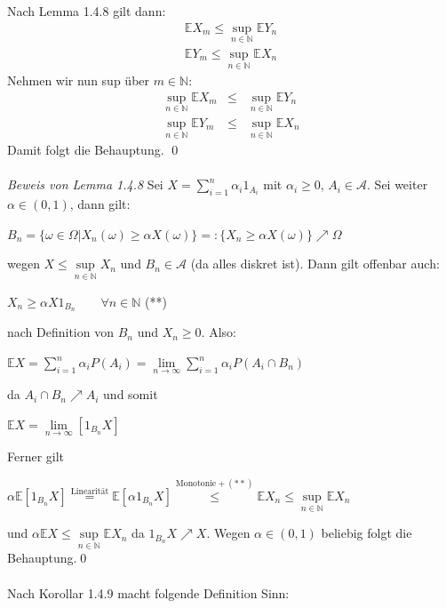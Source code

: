 \documentclass[10pt,a4paper]{report}
\numberwithin{equation}{section}
\numberwithin{figure}{section}
\theoremstyle{plain}
\theoremstyle{definition}
\theoremstyle{plain}
\theoremstyle{definition}
\theoremstyle{remark}
\theoremstyle{plain}
\begin{document}
Nach Lemma 1.4.8 gilt dann:
\begin{eqnarray*}
\mathbb{E}X_m\leq \sup\limits_{n\in \mathbb{N}}\mathbb{E} Y_n
\end{eqnarray*}
\begin{eqnarray*}
\mathbb{E}Y_m\leq \sup\limits_{n\in \mathbb{N}}\mathbb{E} X_n
\end{eqnarray*}
Nehmen wir nun sup über $m \in \mathbb{N}$:
\begin{eqnarray*}
\sup\limits_{n\in \mathbb{N}}\mathbb{E}X_m &\leq &\sup\limits_{n\in \mathbb{N}}\mathbb{E}Y_n\\
\sup\limits_{n\in \mathbb{N}}\mathbb{E}Y_m &\leq &\sup\limits_{n\in \mathbb{N}}\mathbb{E}X_n
\end{eqnarray*}
Damit folgt die Behauptung. \qed\\\\
\textit{Beweis von Lemma 1.4.8}
Sei $X=\sum\limits_{i=1}^n\alpha_i1_{A_i}$ mit $\alpha_i \geq 0$, $A_i \in \mathcal{A}$. Sei weiter $\alpha \in (0,1)$, dann gilt:
\begin{center}
$B_n=\{\omega \in \Omega|X_n(\omega)\geq \alpha X(\omega)\}=:\{X_n\geq \alpha X(\omega)\}\nearrow \Omega$
\end{center}
wegen  $X \leq \sup\limits_{n\in \mathbb{N}} X_n$ und $B_n \in \mathcal{A}$ (da alles diskret ist). Dann gilt offenbar auch:
\begin{center}
$X_n \geq \alpha X1_{B_n} \qquad \forall n \in \mathbb{N}$ (**)
\end{center}
nach Definition von $B_n$ und $X_n\geq 0$. Also:
\begin{center}
$\mathbb{E}X=\sum\limits_{i=1}^n\alpha_i P(A_i)=\lim\limits_{n \to \infty} \sum\limits_{i=1}^n\alpha_i P(A_i\cap B_n)$
\end{center}
da $A_i\cap B_n \nearrow A_i$ und somit
\begin{center}
$\mathbb{E}X=\lim\limits_{n \to \infty}[1_{B_n}X]$
\end{center}
Ferner gilt
\begin{center}
$\alpha \mathbb{E}[1_{B_n}X]\overset{\text{Linearität}}{=}\mathbb{E}[\alpha 1_{B_n}X]\overset{\text{Monotonie}+(**)}{\leq}\mathbb{E}X_n\leq\sup\limits_{n\in \mathbb{N}}\mathbb{E}X_n$
\end{center}
und $\alpha \mathbb{E}X\leq \sup\limits_{n\in \mathbb{N}}\mathbb{E}X_n$ da $1_{B_n}X\nearrow X$. Wegen $\alpha \in (0,1)$ beliebig folgt die Behauptung.\qed\\\\
Nach Korollar 1.4.9 macht folgende Definition Sinn:\\\\
\end{document}

